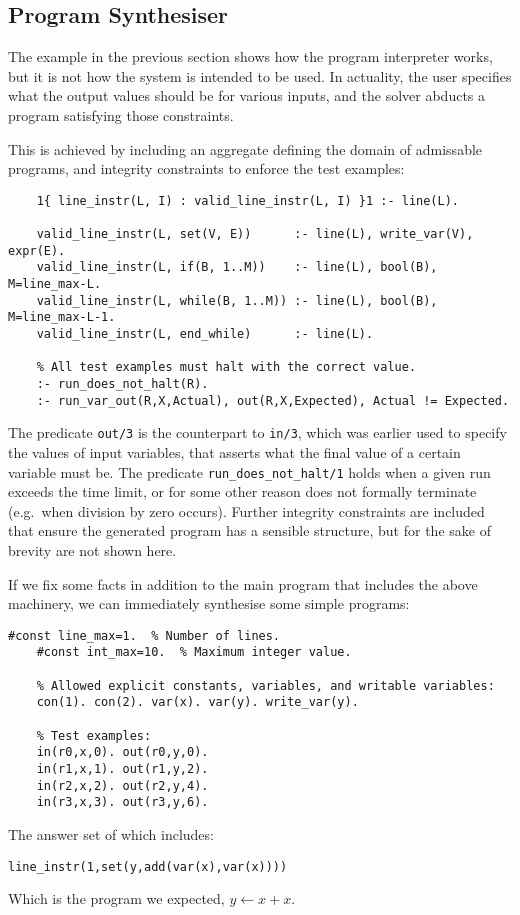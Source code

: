\documentclass[a4paper,twoside,notitlepage]{article}
\newcommand{\ttt}{\texttt}
\begin{document}
\subsection{Program Synthesiser} \label{sec:prgsyn}

The example in the previous section shows how the program interpreter 
works, but it is not how the system is intended to be used. In actuality, 
the user specifies what the output values should be for various inputs, 
and the solver abducts a program satisfying those constraints.

This is achieved by including an aggregate defining the domain of 
admissable programs, and integrity constraints to enforce the test 
examples:
\begin{Verbatim}[samepage=true]
    % Exactly one instruction per line.
    1{ line_instr(L, I) : valid_line_instr(L, I) }1 :- line(L).
    
    valid_line_instr(L, set(V, E))      :- line(L), write_var(V), expr(E).
    valid_line_instr(L, if(B, 1..M))    :- line(L), bool(B), M=line_max-L.
    valid_line_instr(L, while(B, 1..M)) :- line(L), bool(B), M=line_max-L-1.
    valid_line_instr(L, end_while)      :- line(L).
    
    % All test examples must halt with the correct value.
    :- run_does_not_halt(R).
    :- run_var_out(R,X,Actual), out(R,X,Expected), Actual != Expected.
\end{Verbatim}
The predicate \ttt{out/3} is the counterpart to \ttt{in/3}, which was 
earlier used to specify the values of input variables, that asserts what 
the final value of a certain variable must be. The predicate 
\ttt{run\_does\_not\_halt/1} holds when a given run exceeds the time 
limit, or for some other reason does not formally terminate (e.g.\ when 
division by zero occurs). Further integrity constraints are included that 
ensure the generated program has a sensible structure, but for the sake of 
brevity are not shown here.

If we fix some facts in addition to the main program that includes the 
above machinery, we can immediately synthesise some simple programs:
\begin{Verbatim}[samepage=true]
    #const line_max=1.  % Number of lines.
    #const int_max=10.  % Maximum integer value.

    % Allowed explicit constants, variables, and writable variables:
    con(1). con(2). var(x). var(y). write_var(y).
    
    % Test examples:
    in(r0,x,0). out(r0,y,0).
    in(r1,x,1). out(r1,y,2).
    in(r2,x,2). out(r2,y,4).
    in(r3,x,3). out(r3,y,6).
\end{Verbatim}
The answer set of which includes:
\begin{Verbatim}[samepage=true]
    line_instr(1,set(y,add(var(x),var(x))))
\end{Verbatim}
Which is the program we expected, $y \gets x + x$.
\end{document}
